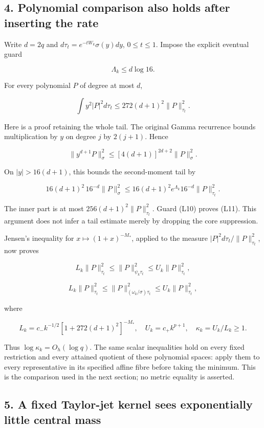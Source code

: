 \documentclass[11pt,a4paper]{article}
\begin{document}
\subsection{4. Polynomial comparison also holds after inserting the rate}\label{loc:polynomial-comparison-also-holds-after-inserting-the-rate}

Write \(d=2q\) and \(d\tau_t=e^{-tW_k}\sigma(y)dy\), \(0\le t\le1\). Impose the explicit eventual guard

\[
\Lambda_k\le d\log16.
\tag{L10}
\]

For every polynomial \(P\) of degree at most \(d\),

\[
\boxed{\int y^2|P|^2d\tau_t\le272(d+1)^2\|P\|_{\tau_t}^2.}
\tag{L11}
\]

Here is a proof retaining the whole tail. The original Gamma recurrence bounds multiplication by \(y\) on degree \(j\) by \(2(j+1)\). Hence

\[
\|y^{d+1}P\|_\sigma^2\le[4(d+1)]^{2d+2}\|P\|_\sigma^2.
\]

On \(|y|>16(d+1)\), this bounds the second-moment tail by

\[
16(d+1)^2\,16^{-d}\|P\|_\sigma^2
\le16(d+1)^2e^{\Lambda_k}16^{-d}\|P\|_{\tau_t}^2.
\]

The inner part is at most \(256(d+1)^2\|P\|_{\tau_t}^2\). Guard (L10) proves (L11). This argument does not infer a tail estimate merely by dropping the core suppression.

Jensen's inequality for \(x\mapsto(1+x)^{-M_*}\), applied to the measure \(|P|^2d\tau_t/\|P\|_{\tau_t}^2\), now proves

\[
L_k\|P\|_{\tau_t}^2\le\|P\|_{\psi_k\tau_t}^2
\le U_k\|P\|_{\tau_t}^2,
\]

\[
L_k\|P\|_{\tau_t}^2\le\|P\|_{(\omega_k/\sigma)\tau_t}^2
\le U_k\|P\|_{\tau_t}^2,
\tag{L12}
\]

where

\[
L_k=c_-k^{-1/2}[1+272(d+1)^2]^{-M_*},\quad
U_k=c_+k^{p+1},\quad\kappa_k=U_k/L_k\ge1.
\tag{L13}
\]

Thus \(\log\kappa_k=O_h(\log q)\). The same scalar inequalities hold on every fixed restriction and every attained quotient of these polynomial spaces: apply them to every representative in its specified affine fibre before taking the minimum. This is the comparison used in the next section; no metric equality is asserted.

\subsection{5. A fixed Taylor-jet kernel sees exponentially little central mass}\label{loc:a-fixed-taylor-jet-kernel-sees-exponentially-little-central-mass}
\end{document}

